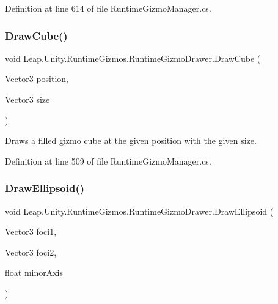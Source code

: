Definition at line 614 of file Runtime\+Gizmo\+Manager.\+cs.

\mbox{\label{class_leap_1_1_unity_1_1_runtime_gizmos_1_1_runtime_gizmo_drawer_a82095c769cf2c976da1174211b71e9ae}} 
\subsubsection{\texorpdfstring{DrawCube()}{DrawCube()}}
{\footnotesize\ttfamily void Leap.\+Unity.\+Runtime\+Gizmos.\+Runtime\+Gizmo\+Drawer.\+Draw\+Cube (\begin{DoxyParamCaption}\item[{Vector3}]{position,  }\item[{Vector3}]{size }\end{DoxyParamCaption})}



Draws a filled gizmo cube at the given position with the given size. 



Definition at line 509 of file Runtime\+Gizmo\+Manager.\+cs.

\mbox{\label{class_leap_1_1_unity_1_1_runtime_gizmos_1_1_runtime_gizmo_drawer_ace421278133ab90a03ed16b9016778f0}} 
\subsubsection{\texorpdfstring{DrawEllipsoid()}{DrawEllipsoid()}}
{\footnotesize\ttfamily void Leap.\+Unity.\+Runtime\+Gizmos.\+Runtime\+Gizmo\+Drawer.\+Draw\+Ellipsoid (\begin{DoxyParamCaption}\item[{Vector3}]{foci1,  }\item[{Vector3}]{foci2,  }\item[{float}]{minor\+Axis }\end{DoxyParamCaption})}



